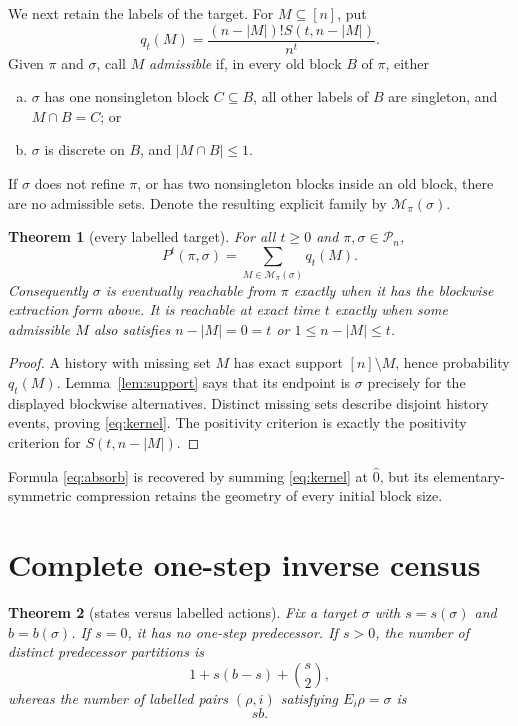 \documentclass[a4paper,10pt]{amsart}
\newtheorem{theorem}{Theorem}[section]
\theoremstyle{remark}
\newcommand{\Pn}{\mathcal P_n}
\begin{document}
We next retain the labels of the target.  For $M\subseteq[n]$, put
\begin{equation}\label{eq:q}
 q_t(M)=\frac{(n-|M|)!S(t,n-|M|)}{n^t}.
\end{equation}
Given $\pi$ and $\sigma$, call $M$ \emph{admissible} if, in every old block
$B$ of $\pi$, either
\begin{enumerate}[(a)]
\item $\sigma$ has one nonsingleton block $C\subseteq B$, all other labels
      of $B$ are singleton, and $M\cap B=C$; or
\item $\sigma$ is discrete on $B$, and $|M\cap B|\le1$.
\end{enumerate}
If $\sigma$ does not refine $\pi$, or has two nonsingleton blocks inside an
old block, there are no admissible sets.  Denote the resulting explicit
family by $\mathcal M_\pi(\sigma)$.

\begin{theorem}[every labelled target]\label{thm:kernel}
For all $t\ge0$ and $\pi,\sigma\in\Pn$,
\begin{equation}\label{eq:kernel}
 P^t(\pi,\sigma)=\sum_{M\in\mathcal M_\pi(\sigma)}q_t(M).
\end{equation}
Consequently $\sigma$ is eventually reachable from $\pi$ exactly when it
has the blockwise extraction form above.  It is reachable at exact time $t$
exactly when some admissible $M$ also satisfies
$n-|M|=0=t$ or $1\le n-|M|\le t$.
\end{theorem}

\begin{proof}
A history with missing set $M$ has exact support $[n]\setminus M$, hence
probability $q_t(M)$.  Lemma~\ref{lem:support} says that its endpoint is
$\sigma$ precisely for the displayed blockwise alternatives.  Distinct
missing sets describe disjoint history events, proving \eqref{eq:kernel}.
The positivity criterion is exactly the positivity criterion for
$S(t,n-|M|)$.
\end{proof}

Formula \eqref{eq:absorb} is recovered by summing \eqref{eq:kernel} at
$\widehat0$, but its elementary-symmetric compression retains the geometry
of every initial block size.

\section{Complete one-step inverse census}

\begin{theorem}[states versus labelled actions]\label{thm:inverse}
Fix a target $\sigma$ with $s=s(\sigma)$ and $b=b(\sigma)$.  If $s=0$, it
has no one-step predecessor.  If $s>0$, the number of distinct predecessor
partitions is
\begin{equation}\label{eq:predstates}
 1+s(b-s)+\binom{s}{2},
\end{equation}
whereas the number of labelled pairs $(\rho,i)$ satisfying
$E_i\rho=\sigma$ is
\begin{equation}\label{eq:actions}
 sb.
\end{equation}
\end{theorem}
\end{document}
